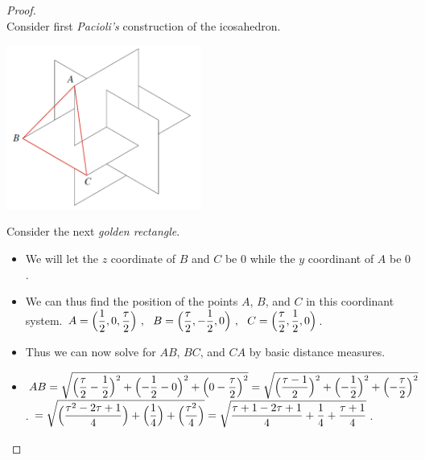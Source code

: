 \documentclass[12pt]{article}
\theoremstyle{plain}
\begin{document}
\begin{proof}
  \ \\
  Consider first \textit{Pacioli's} construction of the icosahedron. \\
  \begin{center}
    \includegraphics[width=0.48\textwidth]{icosahedron.png}
  \end{center}
  Consider the next \textit{golden rectangle}. \\
  \begin{center}
  \end{center}
  \begin{itemize}
    \item We will let the $z$ coordinate of $B$ and $C$ be $0$ while the $y$ coordinant of $A$ be $0$.
    \item We can thus find the position of the points $A$, $B$, and $C$ in this coordinant system.
    \subitem $ \displaystyle A = \Bigl( \frac{1}{2}, 0, \frac{\tau}{2} \Bigr) \ , \ \ B = \Bigl( \frac{\tau}{2}, -\frac{1}{2}, 0 \Bigr) \ , \ \ C = \Bigl( \frac{\tau}{2}, \frac{1}{2}, 0 \Bigr) $.
    \item Thus we can now solve for $AB$, $BC$, and $CA$ by basic distance measures.
    \item $ \displaystyle AB = \sqrt{\Bigl( \frac{\tau}{2} - \frac{1}{2} \Bigr)^2 + \Bigl( -\frac{1}{2} - 0 \Bigr)^2 + \Bigl( 0 - \frac{\tau}{2} \Bigr)^2} = \sqrt{\Bigl( \frac{\tau - 1}{2} \Bigr)^2 + \Bigl( -\frac{1}{2} \Bigr)^2 + \Bigl( - \frac{\tau}{2} \Bigr)^2} $.
    \subitem $ \displaystyle = \sqrt{\Bigl( \frac{\tau^2 -2\tau + 1}{4} \Bigr) + \Bigl( \frac{1}{4} \Bigr) + \Bigl( \frac{\tau^2}{4} \Bigr)} = \sqrt{ \frac{\tau + 1 -2\tau + 1}{4} + \frac{1}{4} + \frac{\tau + 1}{4} } $.

\end{itemize}
\end{proof}
\end{document}
